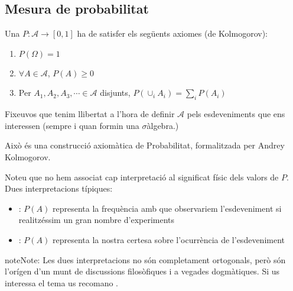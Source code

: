 \documentclass[letterpaper,10pt,english]{sphinxmanual}
\begin{document}
\subsection{Mesura de probabilitat}
\label{\detokenize{0_Intro/0_1_Repas_probabilitat:mesura-de-probabilitat}}
Una  \(P: \mathcal{A} \rightarrow \left[0, 1\right]\)
ha de satisfer els següents axiomes (de Kolmogorov):
\begin{enumerate}
%
\item {} 
\(P\left(\Omega\right)=1\)

\item {} 
\(\forall A\in\mathcal{A}\), \(P\left(A\right)\geq 0\)

\item {} 
Per \(A_1,A_2,A_3, \cdots \in \mathcal{A}\) disjunts, \(P\left(\cup_i A_i\right) = \sum_i P\left(A_i\right)\)

\end{enumerate}

Fixeu\sphinxhyphen{}vos que tenim llibertat a l’hora de definir \(\mathcal{A}\) pels esdeveniments que ens
interessen (sempre i quan formin una \(\sigma\)\sphinxhyphen{}àlgebra.)

Això és una construcció axiomàtica de Probabilitat, formalitzada per Andrey Kolmogorov.

Noteu que no hem associat cap interpretació al significat físic dels valors de \(P\). Dues interpretacions típiques:
\begin{itemize}
\item {} 
: \(P\left(A\right)\) representa la frequència amb que observariem l’esdeveniment  si realitzéssim un gran nombre d’experiments

\item {} 
: \(P\left(A\right)\) representa la nostra certesa sobre l’ocurrència de l’esdeveniment 

\end{itemize}

\begin{sphinxadmonition}{note}{Note:}
Les dues interpretacions no són completament ortogonals, però són l’orígen d’un munt de
discussions filosòfiques i a vegades dogmàtiques. Si us interessa el tema us recomano
.
\end{sphinxadmonition}
\end{document}
